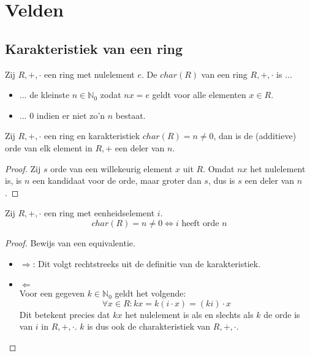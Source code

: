 \documentclass[main.tex]{subfiles}
\begin{document}
\chapter{Velden}
\label{cha:velden}

\section{Karakteristiek van een ring}
\label{sec:karakt-van-een}

\begin{de}
  Zij $R,+,\cdot$ een ring met nulelement $e$.
  De  $char(R)$ van een ring $R,+,\cdot$ is ...
  \begin{itemize}
  \item ... de kleinste $n\in \mathbb{N}_{0}$ zodat $nx=e$ geldt voor alle elementen $x\in R$.
  \item ... $0$ indien er niet zo'n $n$ bestaat.
  \end{itemize}
\end{de} 

\begin{ei}
  Zij $R,+,\cdot$ een ring  en karakteristiek $char(R) = n \neq 0$, dan is de (additieve) orde van elk element in $R,+$ een deler van $n$.

  \begin{proof}
    Zij $s$ orde van een willekeurig element $x$ uit $R$.
    Omdat $nx$ het nulelement is, is $n$ een kandidaat voor de orde, maar groter dan $s$, dus is $s$ een deler van $n$.
  \end{proof}
\end{ei}

\begin{st}
  \label{st:eenheidselement-orde-karakteristiek}
  Zij $R,+,\cdot$ een ring met eenheidselement $i$.
  \[ char(R) = n \neq 0 \Leftrightarrow i \text{ heeft orde } n \]

  \begin{proof}
    Bewijs van een equivalentie.
    \begin{itemize}
    \item $\Rightarrow$: Dit volgt rechtstreeks uit de definitie van de karakteristiek.
    \item $\Leftarrow$\\
      Voor een gegeven $k\in \mathbb{N}_{0}$ geldt het volgende:
      \[ \forall x \in R: kx = k(i\cdot x) = (ki) \cdot x \]
      Dit betekent precies dat $kx$ het nulelement is als en slechts als $k$ de orde is van $i$ in $R,+,\cdot$.
      $k$ is dus ook de charakteristiek van $R,+,\cdot$.
    \end{itemize}
  \end{proof}
\end{st}
\end{document}

